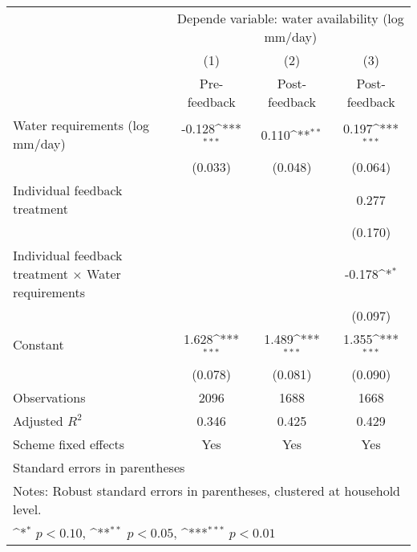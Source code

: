 {
\def\sym#1{\ifmmode^{#1}\else\(^{#1}\)\fi}
\begin{tabular}{l*{3}{c}}
\hline\hline
                    &\multicolumn{3}{c}{Depende variable: water availability (log mm/day)}\\\cmidrule(lr){2-4}
                    &\multicolumn{1}{c}{(1)}&\multicolumn{1}{c}{(2)}&\multicolumn{1}{c}{(3)}\\
                    &\multicolumn{1}{c}{Pre-feedback}&\multicolumn{1}{c}{Post-feedback}&\multicolumn{1}{c}{Post-feedback}\\
\hline
Water requirements (log mm/day)&      -0.128\sym{***}&       0.110\sym{**} &       0.197\sym{***}\\
                    &     (0.033)         &     (0.048)         &     (0.064)         \\
[1em]
Individual feedback treatment&                     &                     &       0.277         \\
                    &                     &                     &     (0.170)         \\
[1em]
Individual feedback treatment $\times$ Water requirements&                     &                     &      -0.178\sym{*}  \\
                    &                     &                     &     (0.097)         \\
[1em]
Constant            &       1.628\sym{***}&       1.489\sym{***}&       1.355\sym{***}\\
                    &     (0.078)         &     (0.081)         &     (0.090)         \\
\hline
Observations        &        2096         &        1688         &        1668         \\
Adjusted \(R^{2}\)  &       0.346         &       0.425         &       0.429         \\
Scheme fixed effects&         Yes         &         Yes         &         Yes         \\
\hline\hline
\multicolumn{4}{l}{\footnotesize Standard errors in parentheses}\\
\multicolumn{4}{l}{\footnotesize Notes: Robust standard errors in parentheses, clustered at household level.}\\
\multicolumn{4}{l}{\footnotesize \sym{*} \(p<0.10\), \sym{**} \(p<0.05\), \sym{***} \(p<0.01\)}\\
\end{tabular}
}
